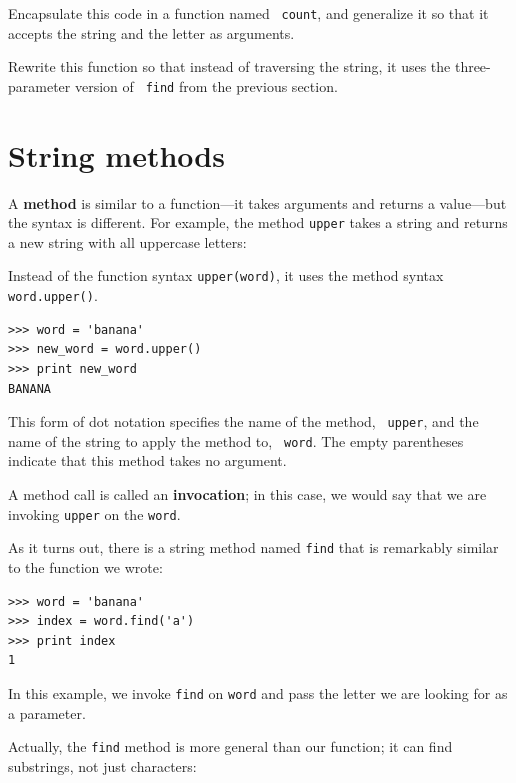 \documentclass[10pt]{book}
\begin{document}
\begin{CJK}{UTF8}{gbsn}
\begin{exercise}

Encapsulate this code in a function named {\tt
count}, and generalize it so that it accepts the string and the
letter as arguments.
\end{exercise}

\begin{exercise}

Rewrite this function so that instead of
traversing the string, it uses the three-parameter version of {\tt
find} from the previous section.

\end{exercise}


\section{String methods}

A {\bf method} is similar to a function---it takes arguments and
returns a value---but the syntax is different.  For example, the
method {\tt upper} takes a string and returns a new string with
all uppercase letters:

Instead of the function syntax {\tt upper(word)}, it uses
the method syntax {\tt word.upper()}.

\begin{verbatim}
>>> word = 'banana'
>>> new_word = word.upper()
>>> print new_word
BANANA
\end{verbatim}
%
This form of dot notation specifies the name of the method, {\tt
upper}, and the name of the string to apply the method to, {\tt
word}.  The empty parentheses indicate that this method takes no
argument.

A method call is called an {\bf invocation}; in this case, we would
say that we are invoking {\tt upper} on the {\tt word}.

As it turns out, there is a string method named {\tt find} that
is remarkably similar to the function we wrote:

\begin{verbatim}
>>> word = 'banana'
>>> index = word.find('a')
>>> print index
1
\end{verbatim}
%
In this example, we invoke {\tt find} on {\tt word} and pass
the letter we are looking for as a parameter.

Actually, the {\tt find} method is more general than our function;
it can find substrings, not just characters:


\end{CJK}
\end{document}

